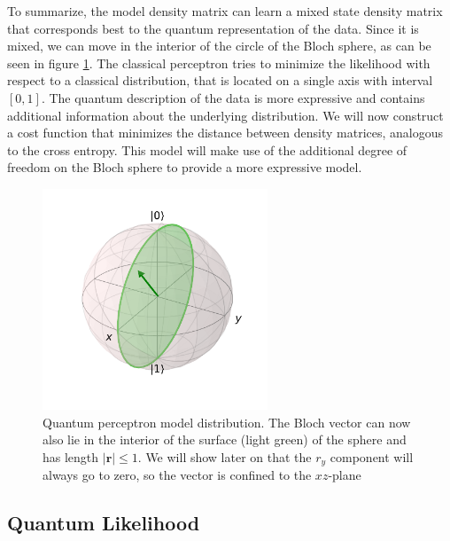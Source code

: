 \noindent To summarize, the model density matrix can learn a mixed state density matrix that corresponds best to the quantum representation of the data. Since it is mixed, we can move in the interior of the circle of the Bloch sphere, as can be seen in figure \ref{fig:classic_bloch3}. The classical perceptron tries to minimize the likelihood with respect to a classical distribution, that is located on a single axis with interval $[0,1]$. The quantum description of the data is more expressive and contains additional information about the underlying distribution. We will now construct a cost function that minimizes the distance between density matrices, analogous to the cross entropy. This model will make use of the additional degree of freedom on the Bloch sphere to provide a more expressive model.
\begin{figure}[htb!]
    \centering
    \includegraphics[width=0.6\textwidth]{figures/chapter3/bloch_sphere_2c.pdf}
    \caption{Quantum perceptron model distribution. The Bloch vector can now also lie in the interior of the surface (light green) of the sphere and has length $|\mathbf{r}|\leq1$. We will show later on that the $r_y$ component will always go to zero, so the vector is confined to the $xz$-plane}
    \label{fig:classic_bloch3}
\end{figure}

\subsection{Quantum Likelihood}

